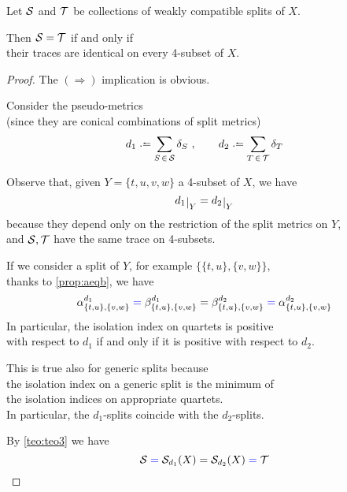 \documentclass[./main.tex]{subfiles}
\begin{document}
\begin{corollary}[{\cites[Corollary 6]{BD92a}}]
    Let ${\mathcal{S}}$ and ${\mathcal{T}}$ be collections of weakly compatible splits of $X$.

    Then ${\mathcal{S}} = {\mathcal{T}}$ if and only if \\
    \bsp their traces are identical on every 4-subset of $X$.
\end{corollary}
\begin{proof}
    The $(\Rightarrow)$ implication is obvious. \bigskip

    Consider the pseudo-metrics \\
    \bsp (since they are conical combinations of split metrics)
    \[ d_1 \defeq \sum_{S \,\in\, \Sc} \delta_S \ , \qquad d_2 \defeq \sum_{T \,\in\, \Tc} \delta_T \]

    Observe that, given $Y = \{t,u,v,w\}$ a 4-subset of $X$, we have
    \[ \restr{d_1}{Y} = \restr{d_2}{Y} \]
    because they depend only on the restriction of the split metrics on $Y$, \\
    \bsp and ${\mathcal{S}},{\mathcal{T}}$ have the same trace on 4-subsets.

    If we consider a split of $Y$, for example $\bigl\{ \{t,u\},\{v,w\} \bigr\}$, \\
    \bsp thanks to \autoref{prop:aeqb}, we have
    \[ \alpha_{\{t,u\},\{v,w\}}^{d_1} \mathcolor{blue}{=} \beta_{\{t,u\},\{v,w\}}^{d_1} = \beta_{\{t,u\},\{v,w\}}^{d_2} \mathcolor{blue}{=} \alpha_{\{t,u\},\{v,w\}}^{d_2} \]
    In particular, the isolation index on quartets is positive \\
    \bsp with respect to $d_1$ if and only if it is positive with respect to $d_2$.

    This is true also for generic splits because \\
    \bsp the isolation index on a generic split is the minimum of \\
    \bsp the isolation indices on appropriate quartets. \\
    In particular, the $d_1$-splits coincide with the $d_2$-splits.
    
    By \autoref{teo:teo3} we have
    \[ \Sc \mathcolor{blue}{=} \Sc_{d_1}(X) = \Sc_{d_2}(X) \mathcolor{blue}{=} \Tc \]
\end{proof}
\end{document}
